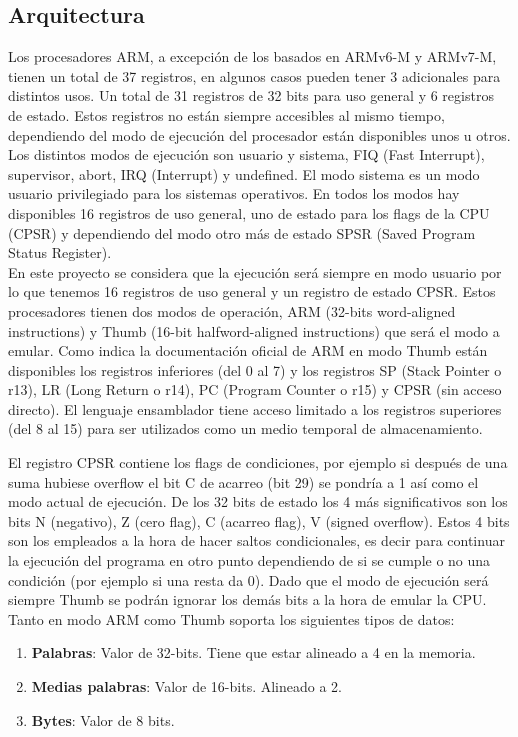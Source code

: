 {    \subsection{Arquitectura}
    Los procesadores ARM, a excepción  de los basados en ARMv6-M y ARMv7-M, tienen un total de 37 registros, en algunos casos pueden tener 3 adicionales para distintos usos.
    Un total de 31 registros de 32 bits para uso general y 6 registros de estado. Estos registros no están siempre accesibles al mismo tiempo, dependiendo del modo de ejecución del procesador están disponibles unos u otros.
    Los distintos modos de ejecución son usuario y sistema, FIQ (Fast Interrupt), supervisor, abort, IRQ (Interrupt) y undefined.
    El modo sistema es un modo usuario privilegiado para los sistemas operativos.
    En todos los modos hay disponibles 16 registros de uso general, uno de estado para los flags de la CPU (CPSR) y dependiendo del modo otro más de estado SPSR (Saved Program Status Register). \\
    \clearpage
    En este proyecto se considera que la ejecución será siempre en modo usuario por lo que tenemos 16 registros de uso general y un registro de estado CPSR.
    Estos procesadores tienen dos modos de operación, ARM (32-bits word-aligned instructions) y Thumb (16-bit halfword-aligned instructions) que será el modo a emular.
    Como indica la documentación oficial de ARM  en modo Thumb están disponibles los registros inferiores (del 0 al 7) y los registros SP (Stack Pointer o r13), LR (Long Return o r14), PC (Program Counter o r15) y CPSR (sin acceso directo).
    El lenguaje ensamblador tiene acceso limitado a los registros superiores (del 8 al 15) para ser utilizados como un medio temporal de almacenamiento.

    El registro CPSR contiene los flags de condiciones, por ejemplo si después de una suma hubiese overflow el bit C de acarreo (bit 29) se pondría a 1 así como el modo actual de ejecución.
    De los 32 bits de estado los 4 más significativos son los bits N (negativo), Z (cero flag), C (acarreo flag), V (signed overflow). Estos 4 bits son los empleados a la hora de hacer saltos condicionales, es decir para
    continuar la ejecución del programa en otro punto dependiendo de si se cumple o no una condición (por ejemplo si una resta da 0). 
    Dado que el modo de ejecución será siempre Thumb se podrán ignorar los demás bits a la hora de emular la CPU. \\

    Tanto en modo ARM como Thumb soporta los siguientes tipos de datos:
    \begin{enumerate}
        \item \textbf{Palabras}: Valor de 32-bits. Tiene que estar alineado a 4 en la memoria.
        \item \textbf{Medias palabras}: Valor de 16-bits. Alineado a 2.
        \item \textbf{Bytes}: Valor de 8 bits.
    \end{enumerate}
}

